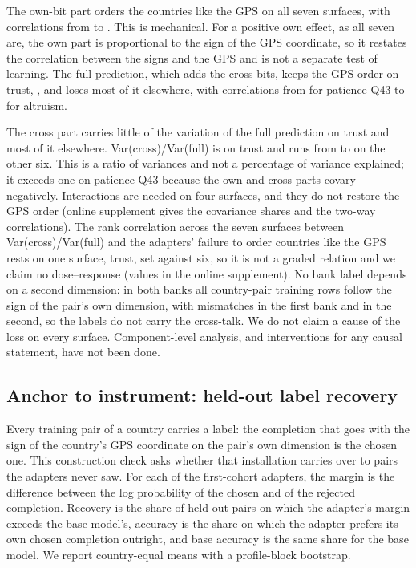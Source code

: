 The own-bit part orders the countries like the GPS on all seven surfaces, with correlations from  to . This is mechanical. For a positive own effect, as all seven are, the own part is proportional to the sign of the GPS coordinate, so it restates the correlation between the signs and the GPS and is not a separate test of learning. The full prediction, which adds the cross bits, keeps the GPS order on trust, , and loses most of it elsewhere, with correlations from  for patience Q43 to  for altruism.

The cross part carries little of the variation of the full prediction on trust and most of it elsewhere. Var(cross)/Var(full) is  on trust and runs from  to  on the other six. This is a ratio of variances and not a percentage of variance explained; it exceeds one on patience Q43 because the own and cross parts covary negatively. Interactions are needed on four surfaces, and they do not restore the GPS order (online supplement gives the covariance shares and the two-way correlations). The rank correlation across the seven surfaces between Var(cross)/Var(full) and the adapters' failure to order countries like the GPS rests on one surface, trust, set against six, so it is not a graded relation and we claim no dose--response (values in the online supplement). No bank label depends on a second dimension: in both banks all  country-pair training rows follow the sign of the pair's own dimension, with  mismatches in the first bank and  in the second, so the labels do not carry the cross-talk. We do not claim a cause of the loss on every surface. Component-level analysis, and interventions for any causal statement, have not been done.

\subsection{Anchor to instrument: held-out label recovery}\label{sec:res-recovery}

Every training pair of a country carries a label: the completion that goes with the sign of the country's GPS coordinate on the pair's own dimension is the chosen one. This construction check asks whether that installation carries over to pairs the adapters never saw. For each of the  first-cohort adapters, the margin is the difference between the log probability of the chosen and of the rejected completion. Recovery is the share of held-out pairs on which the adapter's margin exceeds the base model's, accuracy is the share on which the adapter prefers its own chosen completion outright, and base accuracy is the same share for the base model. We report country-equal means with a profile-block bootstrap.

